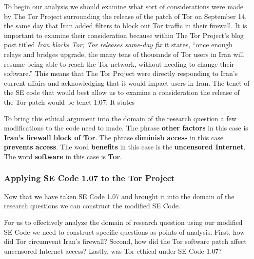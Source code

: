 \documentclass[11pt]{article}
\begin{document}
\begin{multicols}{2}
To begin our analysis we should examine what sort of considerations were made by
The Tor Project surrounding the release of the patch of Tor on September 14, the
same day that Iran added filters to block out Tor traffic in their firewall. It
is important to examine their consideration because within The Tor Project's
blog post titled \textit{Iran blocks Tor; Tor releases same-day fix} it states,
``once enough relays and bridges upgrade, the many tens of thousands of Tor
users in Iran will resume being able to reach the Tor network, without needing
to change their software.''\cite{IranBlocksTorSameDayFix} This means that The Tor Project
were directly responding to Iran's current affairs and acknowledging that it
would impact users in Iran. The tenet of the SE code that would best allow us
to examine a consideration the release of the Tor patch would be tenet 1.07. It
states
\newline
\begin{center}
\end{center}
\smallskip
To bring this ethical argument into the domain of the research question a few
modifications to the code need to made. The phrase \textbf{other factors} in
this case is \textbf{Iran's firewall block of Tor}. The phrase \textbf{diminish
access} in this case \textbf{prevents access}. The word \textbf{benefits} in
this case is the \textbf{uncensored Internet}. The word \textbf{software} in
this case is \textbf{Tor}.

\subsubsection{Applying SE Code 1.07 to the Tor Project}

Now that we have taken SE Code 1.07 and brought it into the domain of the
research questions we can construct the modified SE Code.
\newline
\begin{center}
\end{center}
\smallskip
For us to effectively analyze the domain of research question using our modified
SE Code we need to construct specific questions as points of analysis. First, how
did Tor circumvent Iran's firewall?  Second, how did the Tor software patch
affect uncensored Internet access?  Lastly, was Tor ethical under SE Code 1.07?


\end{multicols}
\end{document}
